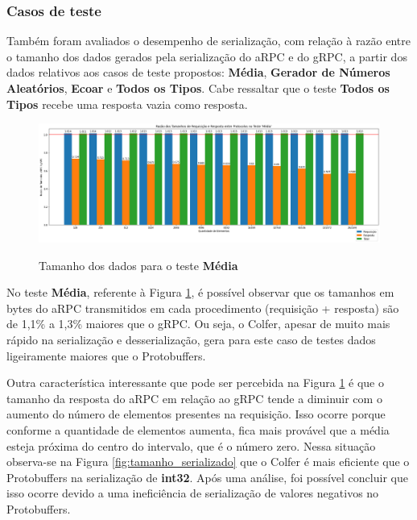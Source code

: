\subsubsection{Casos de teste}

Também foram avaliados o desempenho de serialização, com relação à razão entre o tamanho dos dados gerados pela serialização do aRPC e do gRPC, a partir dos dados relativos aos casos de teste propostos:
\textbf{Média}, \textbf{Gerador de Números Aleatórios}, \textbf{Ecoar} e \textbf{Todos os Tipos}. 
Cabe ressaltar que o teste \textbf{Todos os Tipos} recebe uma resposta vazia como resposta. 

\begin{figure}[ht]
    \centering
    \caption{Tamanho dos dados para o teste \textbf{Média}}
    \includegraphics[width=\textwidth]{figuras/graficos/serializacao/razao_tamanho_average.png} 
    \label{fig:razao_tamanho_average}
\end{figure}

No teste \textbf{Média}, referente à Figura \ref{fig:razao_tamanho_average}, é possível observar que os tamanhos em bytes do aRPC transmitidos em cada procedimento (requisição + resposta) são de 1,1\% a 1,3\% maiores que o gRPC. Ou seja, o Colfer, apesar de muito mais rápido na serialização e desserialização, gera para este caso de testes dados ligeiramente maiores que o Protobuffers. 

Outra característica interessante que pode ser percebida na Figura \ref{fig:razao_tamanho_average} é que o tamanho da resposta do aRPC em relação ao gRPC tende a diminuir com o aumento do número de elementos presentes na requisição. Isso ocorre porque conforme a quantidade de elementos aumenta, fica mais provável que a média esteja próxima do centro do intervalo, que é o número zero. Nessa situação observa-se na Figura \ref{fig:tamanho_serializado} que o Colfer é mais eficiente que o Protobuffers na serialização de \textbf{int32}. Após uma análise, foi possível concluir que isso ocorre devido a uma ineficiência de serialização de valores negativos no Protobuffers.

